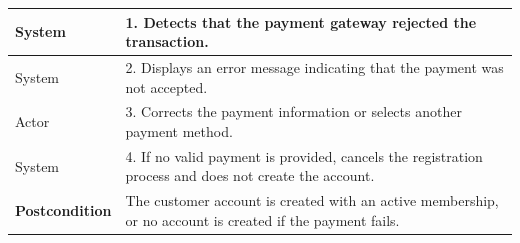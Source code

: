 \documentclass{article}
\begin{document}
\begin{table}[H]
\begin{tabularx}{\textwidth}{|l|X|}
System & 1. Detects that the payment gateway rejected the transaction. \\ \hline
System & 2. Displays an error message indicating that the payment was not accepted. \\ \hline
Actor & 3. Corrects the payment information or selects another payment method. \\ \hline
System & 4. If no valid payment is provided, cancels the registration process and does not create the account. \\ \hline
\textbf{Postcondition} & The customer account is created with an active membership, or no account is created if the payment fails. \\ \hline
\end{tabularx}
\end{table}
\end{document}
